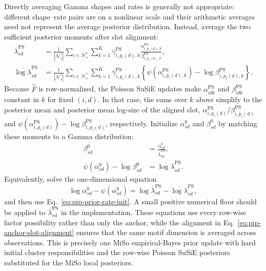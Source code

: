\documentclass[11pt]{article}
\theoremstyle{plain}
\theoremstyle{definition}
\begin{document}
\begin{enumerate}
Directly averaging Gamma shapes and rates is generally not appropriate:
different shape--rate pairs are on a nonlinear scale and their arithmetic
averages need not represent the average posterior distribution. Instead,
average the two sufficient posterior moments after slot alignment:
\begin{align}
  \overline\lambda^{\mathrm{PS}}_{sd}
  &=
  \frac{1}{|\mathcal N_s^*|}
  \sum_{i\in\mathcal N_s^*}\sum_{k=1}^K
  \bar\gamma^{\mathrm{PS}}_{i,p_i(d),k}
  \frac{\alpha^{\mathrm{PS}}_{i,p_i(d),k}}
       {\beta^{\mathrm{PS}}_{i,p_i(d),k}},
  \label{eq:pip-cluster-mean-lambda}\\
  \overline{\log\lambda}^{\mathrm{PS}}_{sd}
  &=
  \frac{1}{|\mathcal N_s^*|}
  \sum_{i\in\mathcal N_s^*}\sum_{k=1}^K
  \bar\gamma^{\mathrm{PS}}_{i,p_i(d),k}
  \left\{
    \psi\!\left(\alpha^{\mathrm{PS}}_{i,p_i(d),k}\right)
    -\log\beta^{\mathrm{PS}}_{i,p_i(d),k}
  \right\}.
  \label{eq:pip-cluster-mean-log-lambda}
\end{align}
Because $\widehat F$ is row-normalized, the Poisson SuSiE updates make
$\alpha^{\mathrm{PS}}_{idk}$ and $\beta^{\mathrm{PS}}_{idk}$ constant in $k$
for fixed $(i,d)$. In that case, the sums over $k$ above simplify to the
posterior mean and posterior mean log-size of the aligned slot,
$\alpha^{\mathrm{PS}}_{i,p_i(d)}/\beta^{\mathrm{PS}}_{i,p_i(d)}$ and
$\psi(\alpha^{\mathrm{PS}}_{i,p_i(d)})-
\log\beta^{\mathrm{PS}}_{i,p_i(d)}$, respectively.
Initialize $\alpha^0_{sd}$ and $\beta^0_{sd}$ by matching these moments to a
Gamma distribution:
\begin{align}
  \beta^0_{sd}
  &=
  \frac{\alpha^0_{sd}}{\overline\lambda^{\mathrm{PS}}_{sd}},
  \label{eq:pip-prior-rate-init}\\
  \psi(\alpha^0_{sd})-\log\beta^0_{sd}
  &=
  \overline{\log\lambda}^{\mathrm{PS}}_{sd}.
  \label{eq:pip-prior-shape-init}
\end{align}
Equivalently, solve the one-dimensional equation
\[
  \log\alpha^0_{sd}-\psi(\alpha^0_{sd})
  =
  \log\overline\lambda^{\mathrm{PS}}_{sd}
  -\overline{\log\lambda}^{\mathrm{PS}}_{sd},
\]
and then use Eq.~\eqref{eq:pip-prior-rate-init}. A small positive numerical
floor should be applied to $\overline\lambda^{\mathrm{PS}}_{sd}$ in the
implementation. These equations use every row-wise factor possibility rather
than only the anchor, while the alignment in
Eq.~\eqref{eq:pip-anchor-slot-alignment} ensures that the same motif dimension
is averaged across observations. This is precisely one MiSo empirical-Bayes
prior update with hard initial cluster responsibilities and the row-wise
Poisson SuSiE posteriors substituted for the MiSo local posteriors.


\end{enumerate}
\end{document}
